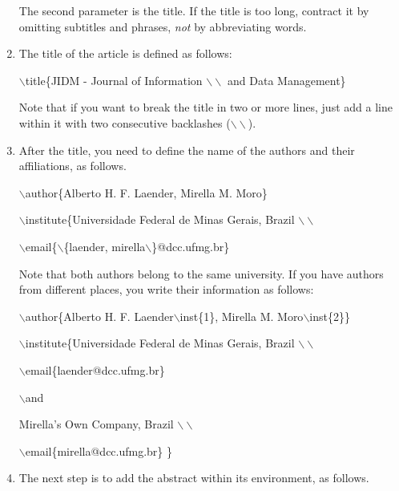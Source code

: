 \documentclass[jidm,a4paper]{jidm} %
\newenvironment{latexcode}
{\ttfamily\vspace{0.1in}\setlength{\parindent}{18pt}}
{\vspace{0.1in}}
\begin{document}
\begin{enumerate}
	The second parameter is the title. If the title is too long, contract it by omitting subtitles and phrases, \textit{not} by abbreviating words.
	
	\item The title of the article is defined as follows:
	
		\begin{latexcode}
				$\backslash$title\{JIDM - Journal of Information $\backslash\backslash$ and Data Management\}
		\end{latexcode}
	
		Note that if you want to break the title in two or more lines, just add a line within it with two consecutive backlashes ($\backslash\backslash$).
	
	\item After the title, you need to define the name of the authors and their affiliations, as follows.

		\begin{latexcode}
				$\backslash$author\{Alberto H. F. Laender, Mirella M. Moro\}
				
				$\backslash$institute\{Universidade Federal de Minas Gerais, Brazil $\backslash\backslash$
				
				$\backslash$email\{$\backslash$\{laender, mirella$\backslash$\}@dcc.ufmg.br\}
				
		\end{latexcode}
	
		Note that both authors belong to the same university. If you have authors from different places, you write their information as follows:
		
		\begin{latexcode}		
				$\backslash$author\{Alberto H. F. Laender$\backslash$inst\{1\}, Mirella M. Moro$\backslash$inst\{2\}\}
				
				$\backslash$institute\{Universidade Federal de Minas Gerais, Brazil $\backslash\backslash$
				
				$\backslash$email\{laender@dcc.ufmg.br\} 
				
				$\backslash$and
				
				Mirella's Own Company, Brazil $\backslash\backslash$
				
				$\backslash$email\{mirella@dcc.ufmg.br\} 	\}		 			 
		\end{latexcode}
		
	\item The next step is to add the abstract within its environment, as follows.
	

\end{enumerate}
\end{document}
